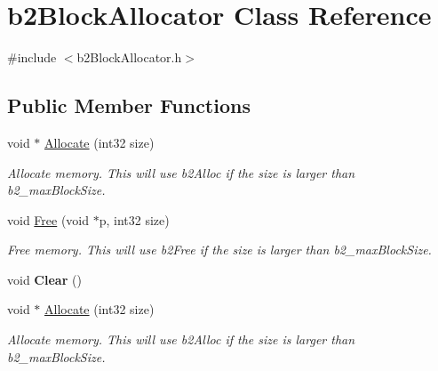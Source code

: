 \hypertarget{classb2BlockAllocator}{}\section{b2\+Block\+Allocator Class Reference}
\label{classb2BlockAllocator}


{\ttfamily \#include $<$b2\+Block\+Allocator.\+h$>$}

\subsection*{Public Member Functions}
\begin{DoxyCompactItemize}
\item 
\mbox{\label{classb2BlockAllocator_a437bf775c23f6e36af11a6d1653d7040}} 
void $\ast$ \hyperlink{classb2BlockAllocator_a437bf775c23f6e36af11a6d1653d7040}{Allocate} (int32 size)
\begin{DoxyCompactList}\small\item\em Allocate memory. This will use b2\+Alloc if the size is larger than b2\+\_\+max\+Block\+Size. \end{DoxyCompactList}\item 
\mbox{\label{classb2BlockAllocator_a945fdf86e260318b930a53dcc887ca8b}} 
void \hyperlink{classb2BlockAllocator_a945fdf86e260318b930a53dcc887ca8b}{Free} (void $\ast$p, int32 size)
\begin{DoxyCompactList}\small\item\em Free memory. This will use b2\+Free if the size is larger than b2\+\_\+max\+Block\+Size. \end{DoxyCompactList}\item 
\mbox{\label{classb2BlockAllocator_a3d3bac86217eba9d1eb6dff2acee0d77}} 
void {\bfseries Clear} ()
\item 
\mbox{\label{classb2BlockAllocator_a60b4b07a234adfe19cd1279805ed6519}} 
void $\ast$ \hyperlink{classb2BlockAllocator_a60b4b07a234adfe19cd1279805ed6519}{Allocate} (int32 size)
\begin{DoxyCompactList}\small\item\em Allocate memory. This will use b2\+Alloc if the size is larger than b2\+\_\+max\+Block\+Size. \end{DoxyCompactList}\item 

\end{DoxyCompactItemize}
